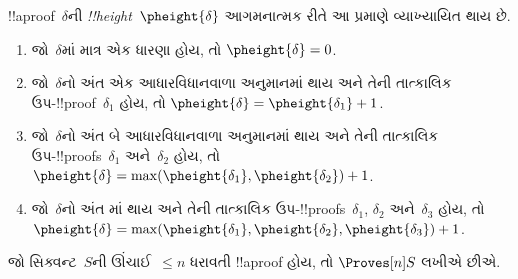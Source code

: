 \documentclass[../../../include/open-logic-section]{subfiles}
\begin{document}


\begin{defn}
!!a{proof}~$\delta$ની
\emph{!!{height}}~$\pheight{\delta}$
આગમનાત્મક રીતે આ
પ્રમાણે વ્યાખ્યાયિત થાય છે.
\begin{enumerate}
  \item જો~$\delta$માં માત્ર
  એક ધારણા હોય, તો
  $\pheight{\delta} = 0$.
  \item જો~$\delta$નો અંત
  એક આધારવિધાનવાળા અનુમાનમાં
  થાય અને તેની તાત્કાલિક
  ઉપ-!!{proof}~$\delta_1$ હોય,
  તો $\pheight{\delta} = \pheight{\delta_1} + 1$.
  \item જો~$\delta$નો અંત
  બે આધારવિધાનવાળા અનુમાનમાં
  થાય અને તેની તાત્કાલિક
  ઉપ-!!{proof}s~$\delta_1$
  અને~$\delta_2$ હોય, તો
  $\pheight{\delta} =
  \max(\pheight{\delta_1}, \pheight{\delta_2}) + 1$.
  \item જો~$\delta$નો અંત
  \Elim{\lor}માં થાય
  અને તેની તાત્કાલિક
  ઉપ-!!{proof}s~$\delta_1$,
  $\delta_2$ અને~$\delta_3$
  હોય, તો
  $\pheight{\delta} =
  \max(\pheight{\delta_1}, \pheight{\delta_2}, \pheight{\delta_3}) + 1$.
\end{enumerate}
જો સિક્વન્ટ~$S$ની
ઊંચાઈ~$\le n$ ધરાવતી
!!a{proof} હોય, તો
$\Proves[n] S$ લખીએ છીએ.
\end{defn}
\end{document}
